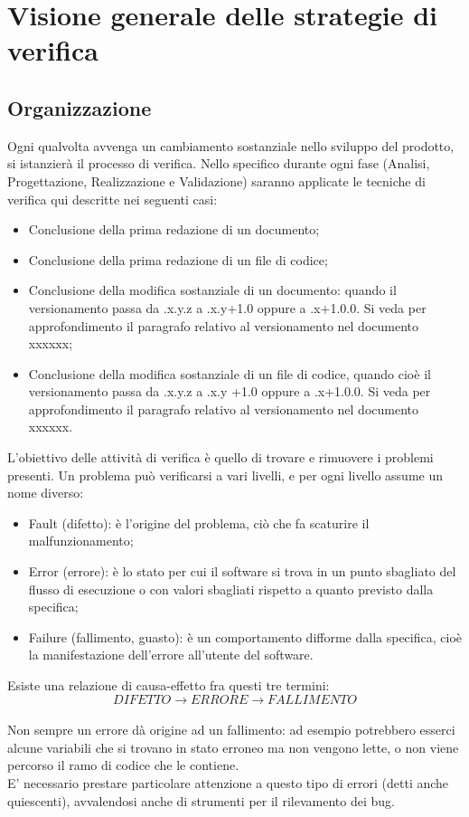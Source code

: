 
\section{Visione generale delle strategie di verifica}

\subsection{Organizzazione}

Ogni qualvolta avvenga un cambiamento sostanziale nello sviluppo del prodotto, si istanzierà il processo di verifica.
Nello specifico durante ogni fase (Analisi, Progettazione, Realizzazione e Validazione) saranno applicate le tecniche di verifica qui descritte nei seguenti casi:
\begin{itemize}

\item Conclusione della prima redazione di un documento;

\item Conclusione della prima redazione di un file di codice;

\item Conclusione della modifica sostanziale di un documento: quando il versionamento passa da .x.y.z a .x.y+1.0 oppure a .x+1.0.0. Si veda per approfondimento il paragrafo relativo al versionamento nel documento xxxxxx;

\item Conclusione della modifica sostanziale di un file di codice, quando cioè il versionamento passa da .x.y.z a .x.y +1.0 oppure a .x+1.0.0. Si veda per approfondimento il paragrafo relativo al versionamento nel documento xxxxxx.
\end{itemize}
L'obiettivo delle attività di verifica è quello di trovare e rimuovere i problemi presenti. Un problema può verificarsi a vari livelli, e per ogni livello assume un nome diverso:
\begin{itemize}
\item Fault (difetto): è l'origine del problema, ciò che fa scaturire il malfunzionamento;
\item Error (errore): è lo stato per cui il software si trova in un punto sbagliato del flusso di esecuzione o con valori sbagliati rispetto a quanto previsto dalla specifica;
\item Failure (fallimento, guasto): è un comportamento difforme dalla specifica, cioè la manifestazione dell'errore all'utente del software.
\end{itemize}
Esiste una relazione di causa-effetto fra questi tre termini:\\
\[DIFETTO\longrightarrow ERRORE\longrightarrow FALLIMENTO\]\\
Non sempre un errore dà origine ad un fallimento: ad esempio potrebbero esserci alcune variabili che si trovano in stato erroneo ma non vengono lette, o non viene percorso il ramo di codice che le contiene.\\
E' necessario prestare particolare attenzione a questo tipo di errori (detti anche quiescenti), avvalendosi anche di strumenti per il rilevamento dei bug.

